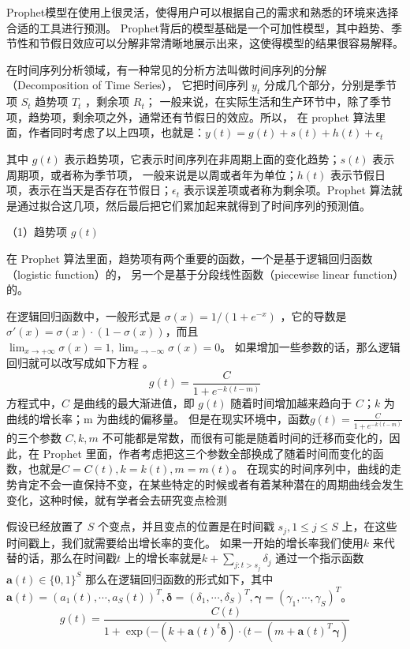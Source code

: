 Prophet模型在使用上很灵活，使得用户可以根据自己的需求和熟悉的环境来选择合适的工具进行预测。
Prophet背后的模型基础是一个可加性模型，其中趋势、季节性和节假日效应可以分解非常清晰地展示出来，这使得模型的结果很容易解释。

在时间序列分析领域，有一种常见的分析方法叫做时间序列的分解（Decomposition of Time Series），
它把时间序列 $y_t$ 分成几个部分，分别是季节项 $S_t$ 趋势项 $T_{t}$ ，剩余项 $R_{t}$；
一般来说，在实际生活和生产环节中，除了季节项，趋势项，剩余项之外，通常还有节假日的效应。所以，
在 prophet 算法里面，作者同时考虑了以上四项，也就是：$y(t) = g(t) + s(t) + h(t) + \epsilon_{t}$ 

其中 $g(t)$ 表示趋势项，它表示时间序列在非周期上面的变化趋势；$s(t)$ 表示周期项，或者称为季节项，
一般来说是以周或者年为单位；$h(t)$ 表示节假日项，表示在当天是否存在节假日；$\epsilon_{t}$ 表示误差项或者称为剩余项。Prophet 算法就是通过拟合这几项，然后最后把它们累加起来就得到了时间序列的预测值。

（1）趋势项 $g(t)$

在 Prophet 算法里面，趋势项有两个重要的函数，一个是基于逻辑回归函数（logistic function）的，
另一个是基于分段线性函数（piecewise linear function）的。

在逻辑回归函数中，一般形式是 $\sigma(x) = 1/(1+e^{-x})$ ，它的导数是 $\sigma'(x) = \sigma(x) \cdot(1-\sigma(x))$，而且$\lim_{x\rightarrow +\infty} \sigma(x) = 1, \lim_{x\rightarrow -\infty} \sigma(x) = 0$。
如果增加一些参数的话，那么逻辑回归就可以改写成如下方程\cite{李威2021Prophet模型在GNSS坐标时间序列中的插值分析} 。
\begin{equation}
  g(t) = \frac{C}{1 + e^{-k(t - m)}}
\end{equation}
方程式中，$C$ 是曲线的最大渐进值，即 $g(t)$ 随着时间增加越来趋向于 $C$；$k$ 为曲线的增长率；m 为曲线的偏移量。
但是在现实环境中，函数$g(t) = \frac{C}{1 + e^{-k(t - m)}}$的三个参数 $C, k, m$ 不可能都是常数，而很有可能是随着时间的迁移而变化的，因此，在 Prophet 里面，作者考虑把这三个参数全部换成了随着时间而变化的函数，也就是$C = C(t), k = k(t), m = m(t)$。
在现实的时间序列中，曲线的走势肯定不会一直保持不变，在某些特定的时候或者有着某种潜在的周期曲线会发生变化，这种时候，就有学者会去研究变点检测

假设已经放置了 $S$ 个变点，并且变点的位置是在时间戳 $s_{j}, 1\leq j\leq S$ 上，在这些时间戳上，我们就需要给出增长率的变化。
如果一开始的增长率我们使用$k$ 来代替的话，那么在时间戳$t$ 上的增长率就是$k + \sum_{j:t>s_{j}} \delta_{j}$ 通过一个指示函数 $\mathbf{a}(t)\in \{0,1\}^{S}$
那么在逻辑回归函数的形式如下，其中 $\mathbf{a}(t) = (a_{1}(t),\cdots,a_{S}(t))^{T},  \mathbf{\delta} = (\delta_{1},\cdots,\delta_{S})^{T}, \mathbf{\gamma} = (\gamma_{1},\cdots,\gamma_{S})^{T}$。
\begin{equation}
  g(t) = \frac{C(t)}{1+\exp(-(k+\mathbf{a}(t)^{t}\mathbf{\delta}) \cdot (t - (m+\mathbf{a}(t)^{T}\mathbf{\gamma})}
\end{equation}

